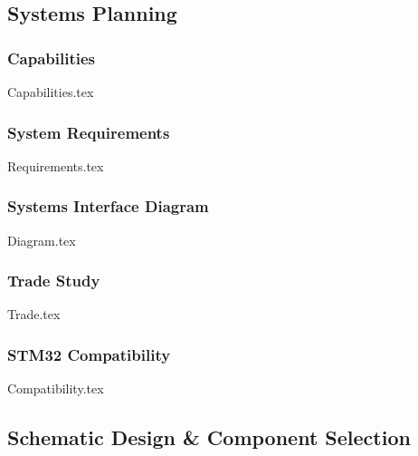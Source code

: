 \subsection{Systems Planning}\label{sec:v1.1-planning}

    \subsubsection{Capabilities}\label{sec:v1.1-capabilities}
        {Capabilities.tex}

    \subsubsection{System Requirements}\label{sec:v1.1-requirements}
        {Requirements.tex}

    \subsubsection{Systems Interface Diagram}
        {Diagram.tex}

    \subsubsection{Trade Study}
        {Trade.tex}

    \subsubsection{STM32 Compatibility}
        {Compatibility.tex}

\subsection{Schematic Design \& Component Selection}\label{sec:v1.1-schematic}



